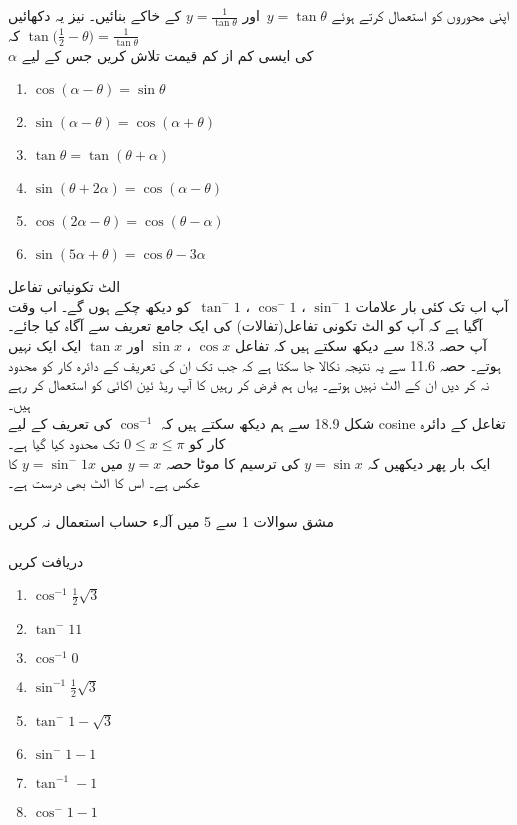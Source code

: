 اپنی محوروں کو استعمال کرتے ہوئے 
\(y=\tan\theta\)\
اور
 \(y=\frac{1}{\tan\theta}\)
کے خاکے بنائیں۔ نیز یہ دکھائیں کہ
\(\tan\Big(\frac{1}{2}-\theta\Big)=\frac{1}{\tan\theta}\)\\
\(\alpha\)
کی ایسی کم از کم قیمت تلاش کریں جس کے لیے\\
\begin{enumerate}
\item
\(\cos(\alpha-\theta)=\sin\theta\)
\item
\(\sin(\alpha-\theta)=\cos(\alpha+\theta)\)
\item
\(\tan\theta=\tan(\theta+\alpha)\)
\item
\(\sin(\theta+2\alpha)=\cos(\alpha-\theta)\)
\item
\(\cos(2\alpha-\theta)=\cos(\theta-\alpha)\)
\item
\(\sin(5\alpha+\theta)=\cos\theta-3\alpha\)
\end{enumerate}
الٹ تکونیاتی تفاعل\\
آپ اب تک کئی بار علامات
\(\sin^-1\)
، 
\(\cos^-1\)
، 
\(\tan^-1\)\
کو دیکھ چکے ہوں گے۔ اب وقت آگیا ہے کہ آپ کو الٹ تکونی تفاعل(تفالات) کی ایک جامع تعریف سے آگاہ کیا جائے۔\\
آپ حصہ 18.3 سے دیکھ سکتے ہیں کہ تفاعل
\(\cos x\)
، 
\(\sin x\)
اور 
 \(\tan x\)
ایک ایک نہیں ہوتے۔ حصہ 11.6 سے یہ نتیجہ نکالا جا سکتا ہے کہ جب تک ان کی تعریف کے دائرہ کار کو محدود نہ کر دیں ان کے الٹ نہیں ہوتے۔ یہاں ہم فرض کر رہیں کا آپ ریڈ ئین اکائی کو استعمال کر رہے ہیں۔\\
شکل 18.9 سے ہم دیکھ سکتے ہیں کہ 
\(\cos^{-1}\)
کی تعریف کے لیے 
cosine
تغاعل کے دائرہ کار کو
\( 0\le x \le \pi\) 
تک محدود کیا گیا ہے۔\\
ایک بار پھر دیکھیں کہ
\(y=\sin{x}\) 
کی ترسیم کا موٹا حصہ 
\( y=x\) 
میں 
 \(y=\sin^-1 x \) 
کا عکس ہے۔
اس کا الٹ  بھی درست ہے۔\\
\\مشق
سوالات 1 سے 5 میں آلہء حساب استعمال نہ کریں\\
\\دریافت کریں
\begin{enumerate}
\item
\(\cos^{-1 }\frac{1}{2}\sqrt{3}\)
\item
\(\tan^-{1} 1\)
\item
\(\cos^{-1} 0 \)
\item
\(\sin^{-1} \frac{1}{2}\sqrt{3}\)
\item
\(\tan^-{1} -\sqrt{3}\)
\item
\(\sin^-{1}-1\)
\item
\(\tan^{-1} -1\)
\item
\(\cos^-{1} -1\)
\end{enumerate}
